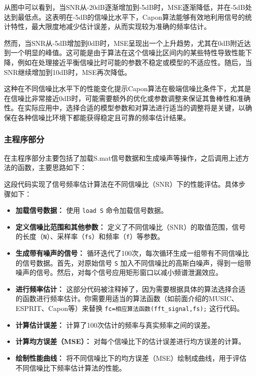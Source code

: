 \documentclass[a4paper,12pt]{article}
\begin{document}
从图中可以看到，当SNR从-20dB逐渐增加到-5dB时，MSE逐渐降低，并在-5dB处达到最低点。这表明在-5dB的信噪比水平下，Capon算法能够有效地利用信号的统计特性，最大限度地减少估计误差，从而实现较为准确的频率估计。

然而，当SNR从-5dB增加到0dB时，MSE呈现出一个上升趋势，尤其在0dB附近达到一个明显的峰值。这可能是由于算法在这个信噪比区间内的某些特性导致性能下降，例如在处理接近平衡信噪比时可能的参数不稳定或模型的不适应性。随后，当SNR继续增加到10dB时，MSE再次降低。

这种在不同信噪比水平下的性能变化提示Capon算法在极端信噪比条件下，尤其是在信噪比非常接近0dB时，可能需要额外的优化或参数调整来保证其鲁棒性和准确性。在实际应用中，选择合适的模型参数和对算法进行适当的调整将是关键，以确保在各种信噪比环境下都能获得稳定且可靠的频率估计结果。

\subsubsection{主程序部分}
在主程序部分主要包括了加载S.mat信号数据和生成噪声等操作，之后调用上述方法的函数，主要思路如下：

这段代码实现了信号频率估计算法在不同信噪比（SNR）下的性能评估。具体步骤如下：
\begin{itemize}
    \item \textbf{加载信号数据：} 使用 \texttt{load S} 命令加载信号数据。
    \item \textbf{定义信噪比范围和其他参数：} 定义了不同信噪比（SNR）的取值范围，信号的长度（\texttt{N}）、采样率（\texttt{fs}）和频率（\texttt{f}）等参数。
    \item \textbf{生成带有噪声的信号：} 循环迭代了100次，每次循环生成一组带有不同信噪比的信号数据。首先，对原始信号 \texttt{S} 加入不同信噪比的高斯白噪声，得到一组带噪声的信号。然后，对每个信号应用矩形窗口以减小频谱泄漏效应。
    \item \textbf{进行频率估计：} 这部分代码被注释掉了，因为需要根据具体的算法选择合适的函数进行频率估计。你需要用适当的算法函数（如前面介绍的MUSIC、ESPRIT、Capon等）来替换 \texttt{fc=相应算法函数(fft\_signal,fs);} 这行代码。
    \item \textbf{计算估计误差：} 计算了100次估计的频率与真实频率之间的误差。
    \item \textbf{计算均方误差（MSE）：} 对每个信噪比下的估计误差进行均方误差的计算。
    \item \textbf{绘制性能曲线：} 将不同信噪比下的均方误差（MSE）绘制成曲线，用于评估不同信噪比下频率估计算法的性能。
\end{itemize}
\end{document}
